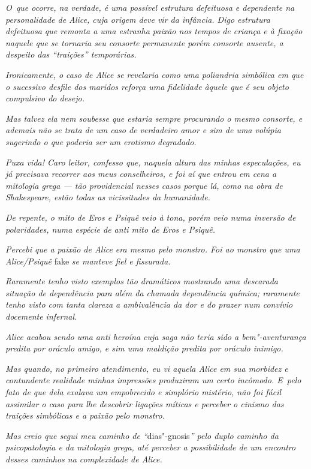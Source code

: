 \emph{O~que ocorre, na verdade, é uma possível estrutura defeituosa e
dependente na personalidade de Alice, cuja origem deve vir da infância.
Digo estrutura defeituosa que remonta a uma estranha paixão nos tempos
de criança e à fixação naquele que se tornaria seu consorte permanente
porém consorte ausente, a despeito das ``traições'' temporárias.}~

\emph{Ironicamente, o caso de Alice se revelaria como uma poliandria
simbólica em que o sucessivo desfile dos maridos reforça uma fidelidade
àquele que é seu objeto compulsivo do desejo.}~

\emph{Mas talvez ela nem soubesse que estaria sempre procurando o mesmo
consorte, e ademais não se trata de um caso de verdadeiro amor e sim de
uma volúpia sugerindo o que poderia ser um erotismo degradado.}~

\emph{Puxa vida! Caro leitor, confesso que, naquela altura das minhas
especulações, eu já precisava recorrer aos meus conselheiros, e foi aí
que entrou em cena a mitologia grega --- tão providencial nesses casos
porque lá, como na obra de Shakespeare, estão todas as vicissitudes da
humanidade.}~

\emph{De repente, o mito de Eros e Psiquê veio à tona, porém veio numa
inversão de polaridades, numa espécie de anti mito de Eros e Psiquê.}~

\emph{Percebi que a paixão de Alice era mesmo pelo monstro. Foi ao
monstro que uma Alice/Psiquê} fake \emph{se manteve fiel e fissurada.}~

\emph{Raramente tenho visto exemplos tão dramáticos mostrando uma
descarada situação de dependência para além da chamada dependência
química; raramente tenho visto com tanta clareza a ambivalência da dor e
do prazer num convívio docemente infernal.}~

\emph{Alice acabou sendo uma anti heroína cuja saga não teria sido a
bem"-aventurança predita por oráculo amigo, e sim uma maldição predita
por oráculo inimigo.}~

\emph{Mas quando, no primeiro atendimento, eu vi aquela Alice em sua
morbidez e contundente realidade minhas impressões produziram um certo
incômodo. E~pelo fato de que dela exalava um empobrecido e simplório
mistério, não foi fácil assimilar o caso para lhe descobrir ligações
míticas e perceber o cinismo das traições simbólicas e a paixão pelo
monstro.}~

\emph{Mas creio que segui meu caminho de ``}dias"-gnosis\emph{'' pelo
duplo caminho da psicopatologia e da mitologia grega, até perceber a
possibilidade de um encontro desses caminhos na complexidade de Alice.}~


